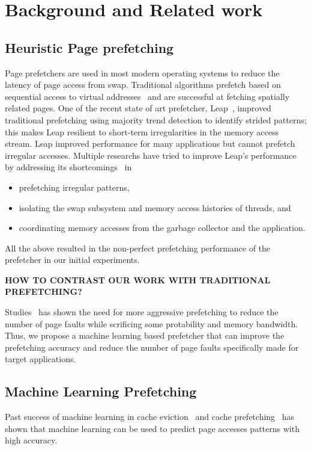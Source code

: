 \section{Background and Related work}\label{sec:2}

\subsection{Heuristic Page prefetching}
Page prefetchers are used in most modern operating systems to reduce the latency of page access from swap. 
Traditional algorithms prefetch based on sequential access to virtual addresses~\cite{vma-readahead, vm_fault_readahead} and are successful at fetching spatially related pages. 
One of the recent state of art prefetcher, Leap~\cite{leap}, improved traditional prefetching using majority trend detection to identify strided patterns; this makes Leap resilient to short-term irregularities in the memory access stream.
Leap improved performance for many applications but cannot prefetch irregular accesses. 
Multiple researchs have tried to improve Leap's performance by addressing its shortcomings~\cite{canvas, dilos, memliner} in \begin{itemize}
    \item prefetching irregular patterns,
    \item isolating the swap subsystem and memory access histories of threads, and
    \item coordinating memory accesses from the garbage collector and the application.
\end{itemize}

All the above resulted in the non-perfect prefetching performance of the prefetcher in our initial experiments.

\textbf{HOW TO CONTRAST OUR WORK WITH TRADITIONAL PREFETCHING?}

Studies~\cite{Aggressive} has shown the need for more aggressive prefetching to reduce the number of page faults while scrificing some protability and memory bandwidth. Thus, we propose a machine learning based prefetcher that can improve the prefetching accuracy and reduce the number of page faults specifically made for target applications.

\subsection{Machine Learning Prefetching}
Past success of machine learning in cache eviction~\cite{RelaxedBelady} and cache prefetching~\cite{LMAP} has shown that machine learning can be used to predict page accesses patterns with high accuracy.

